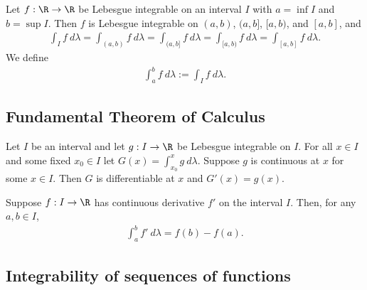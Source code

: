 \documentclass{article}
\begin{document}
\begin{corollary}
	Let $f:\R\to\R$ be Lebesgue integrable on an interval $I$ with $a=\inf I$ and $b=\sup I$.
	Then $f$ is Lebesgue integrable on $(a,b)$, $(a,b]$, $[a,b)$, and $[a,b]$, and
	\begin{align*}
		\int_I f\:d\lambda
		= \int_{(a,b)} f\:d\lambda
		= \int_{(a,b]} f\:d\lambda
		= \int_{[a,b)} f\:d\lambda
		= \int_{[a,b]} f\:d\lambda.
	\end{align*}
	We define
	\begin{align*}
		\int_a^b f\:d\lambda := \int_If\:d\lambda.
	\end{align*}
\end{corollary}

\subsection{Fundamental Theorem of Calculus}

\begin{theorem}
	Let $I$ be an interval and let $g:I\to\R$ be Lebesgue integrable on $I$. For all $x\in I$ and
	some fixed $x_0\in I$ let $G(x) = \int_{x_0}^x g\:d\lambda$. Suppose $g$ is continuous at $x$
	for some $x\in I$. Then $G$ is differentiable at $x$ and $G'(x)=g(x)$.
\end{theorem}

\begin{theorem}
	Suppose $f:I\to\R$ has continuous derivative $f'$ on the interval $I$. Then, for any
	$a,b\in I$,
	\begin{align*}
		\int_a^b f'\:d\lambda= f(b) - f(a).
	\end{align*}
\end{theorem}

\subsection{Integrability of sequences of functions}
\end{document}
